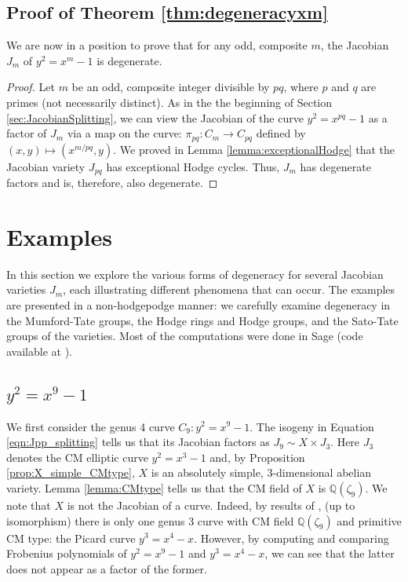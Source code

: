 \documentclass[reqno, oneside, 12pt]{amsart}
\newcommand{\Q}{\mathbb{Q}}
\theoremstyle{remark}
\numberwithin{equation}{section}
\begin{document}
\subsection{Proof of  Theorem \ref{thm:degeneracyxm}}\label{sec:proofdegeneracyxm}
We are now in a position to prove that for any odd, composite $m$, the Jacobian $J_m$ of $y^2=x^m-1$ is degenerate.
\begin{proof}
Let $m$ be an odd, composite integer divisible by $pq$, where $p$ and $q$ are primes (not necessarily distinct). As in the the beginning of Section \ref{sec:JacobianSplitting}, we can view the Jacobian of the curve $y^2=x^{pq}-1$ as a factor of $J_m$ via a map on the curve: $\pi_{pq}\colon C_m \to C_{pq}$ defined by $(x,y)\mapsto (x^{m/pq},y)$. We proved in Lemma \ref{lemma:exceptionalHodge} that the Jacobian variety $J_{pq}$ has exceptional Hodge cycles. Thus, $J_m$ has degenerate factors and is, therefore, also degenerate.
\end{proof}
















\section{Examples}\label{sec:DegenerateExamples}
In this section we explore the various forms of degeneracy for several Jacobian varieties $J_m$, each illustrating different phenomena that can occur. The examples are presented in a non-hodgepodge manner: we carefully examine degeneracy in the Mumford-Tate groups, the Hodge rings and  Hodge groups, and the Sato-Tate groups of the  varieties. Most of the computations were done in Sage (code available at \cite{GoodsonGithub}).

\subsection{$y^2=x^9-1$}\label{sec:Example9}

We first consider the genus 4 curve $C_9\colon y^2=x^9-1$. The isogeny in Equation \eqref{eqn:Jpp_splitting} tells us that its Jacobian factors as $J_9\sim X \times J_3$. Here $J_3$ denotes the CM elliptic curve $y^2=x^3-1$ and, by Proposition \ref{prop:X_simple_CMtype}, $X$ is an absolutely simple, 3-dimensional abelian variety. Lemma \ref{lemma:CMtype} tells us that the CM field of  $X$ is $\Q(\zeta_9)$. We note that $X$ is not the Jacobian of a curve. Indeed, by results of \cite{Kilicer2018}, (up to isomorphism) there is only one genus 3 curve with CM field $\Q(\zeta_9)$ and primitive CM type: the Picard curve $y^3=x^4-x$. However, by computing and comparing Frobenius polynomials of $y^2=x^9-1$ and $y^3=x^4-x$, we can see that the latter does not appear as a factor of the former.
\end{document}
